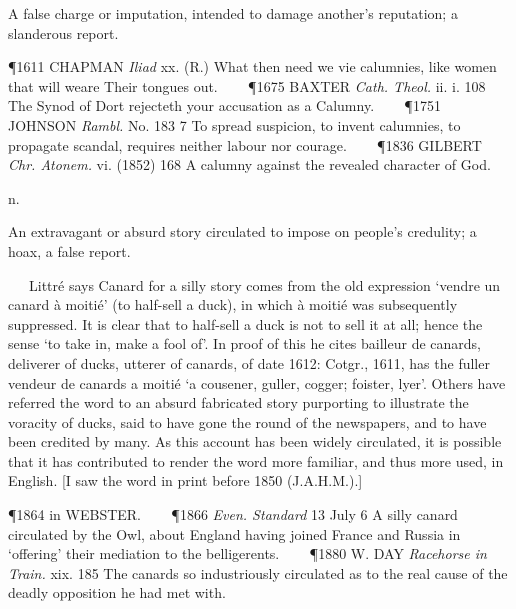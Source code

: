 \begin{description}[wide, labelwidth=!, labelindent=0pt]
\begin{myenumerate}
 A false charge or imputation, intended to damage another's reputation; a slanderous report.

\P 1611 CHAPMAN  \textit{Iliad} xx. (R.) What then need we vie calumnies, like women that will weare Their tongues out.    
\P 1675 BAXTER  \textit{Cath. Theol.} ii. i. 108 The Synod of Dort rejecteth your accusation as a Calumny.    
\P 1751 JOHNSON  \textit{Rambl.} No. 183 7 To spread suspicion, to invent calumnies, to propagate scandal, requires neither labour nor courage.    
\P 1836 GILBERT  \textit{Chr. Atonem.} vi. (1852) 168 A calumny against the revealed character of God.
\end{myenumerate}


 n.

\noindent {}

\vspace{-0.3cm}

\begin{myenumerate}

 An extravagant or absurd story circulated to impose on people's credulity; a hoax, a false report.

   Littré says Canard for a silly story comes from the old expression ‘vendre un canard à moitié’ (to half-sell a duck), in which à moitié was subsequently suppressed. It is clear that to half-sell a duck is not to sell it at all; hence the sense ‘to take in, make a fool of’. In proof of this he cites bailleur de canards, deliverer of ducks, utterer of canards, of date 1612: Cotgr., 1611, has the fuller vendeur de canards a moitié ‘a cousener, guller, cogger; foister, lyer’. Others have referred the word to an absurd fabricated story purporting to illustrate the voracity of ducks, said to have gone the round of the newspapers, and to have been credited by many. As this account has been widely circulated, it is possible that it has contributed to render the word more familiar, and thus more used, in English. [I saw the word in print before 1850 (J.A.H.M.).]

\P 1864 in WEBSTER.    
\P 1866 \textit{Even. Standard} 13 July 6 A silly canard circulated by the Owl, about England having joined France and Russia in ‘offering’ their mediation to the belligerents.    
\P 1880 W. DAY  \textit{Racehorse in Train.} xix. 185 The canards so industriously circulated as to the real cause of the deadly opposition he had met with.


\end{myenumerate}
\end{description}
